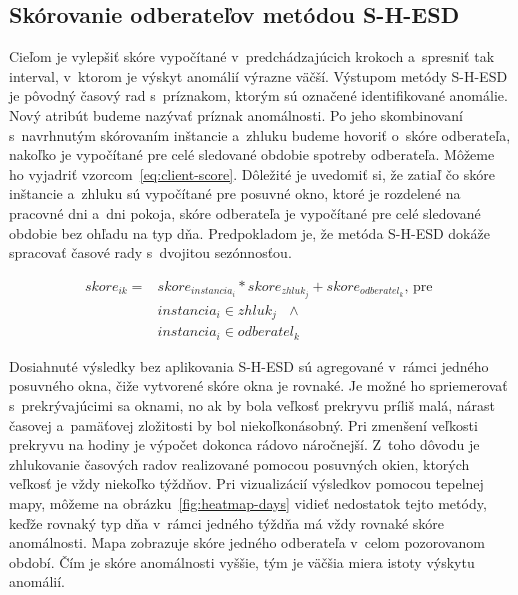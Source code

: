 \documentclass[a4paper,twoside,slovak,12pt,appendix]{article}
\begin{document}
\subsection{Skórovanie odberateľov metódou S-H-ESD}
\label{c:shesd-scoring}
Cieľom je vylepšiť skóre vypočítané v~predchádzajúcich krokoch a~spresniť tak
interval, v~ktorom je výskyt anomálií výrazne väčší. Výstupom metódy S-H-ESD je
pôvodný časový rad s~príznakom, ktorým sú označené identifikované anomálie. Nový
atribút budeme nazývať príznak anomálnosti. Po jeho skombinovaní s~navrhnutým
skórovaním inštancie a~zhluku budeme hovoriť o~skóre odberateľa, nakoľko je
vypočítané pre celé sledované obdobie spotreby odberateľa. Môžeme ho vyjadriť
vzorcom~\ref{eq:client-score}. Dôležité je uvedomiť si, že zatiaľ čo skóre
inštancie a~zhluku sú vypočítané pre posuvné okno, ktoré je rozdelené na
pracovné dni a~dni pokoja, skóre odberateľa je vypočítané pre celé sledované
obdobie bez ohľadu na typ dňa. Predpokladom je, že metóda S-H-ESD dokáže
spracovať časové rady s~dvojitou sezónnosťou.

\begin{equation}
  \begin{split}
    skore_{ik} = & skore_{instancia_i} * skore_{zhluk_j} + skore_{odberatel_k} \text{, pre } \\
    & instancia_i \in zhluk_j \text{ } \land \\
    & instancia_i \in odberatel_k
  \end{split}
  \label{eq:client-score}
\end{equation}

\noindent
Dosiahnuté výsledky bez aplikovania S-H-ESD sú agregované v~rámci jedného
posuvného okna, čiže vytvorené skóre okna je rovnaké. Je možné ho spriemerovať
s~prekrývajúcimi sa oknami, no ak by bola veľkosť prekryvu príliš malá, nárast
časovej a~pamäťovej zložitosti by bol niekoľkonásobný. Pri zmenšení veľkosti
prekryvu na hodiny je výpočet dokonca rádovo náročnejší. Z~toho dôvodu je
zhlukovanie časových radov realizované pomocou posuvných okien, ktorých veľkosť
je vždy niekoľko týždňov. Pri vizualizácií výsledkov pomocou tepelnej mapy,
môžeme na obrázku~\ref{fig:heatmap-days} vidieť nedostatok tejto metódy, keďže
rovnaký typ dňa v~rámci jedného týždňa má vždy rovnaké skóre anomálnosti. Mapa
zobrazuje skóre jedného odberateľa v~celom pozorovanom období. Čím je skóre
anomálnosti vyššie, tým je väčšia miera istoty výskytu anomálií.
\end{document}
